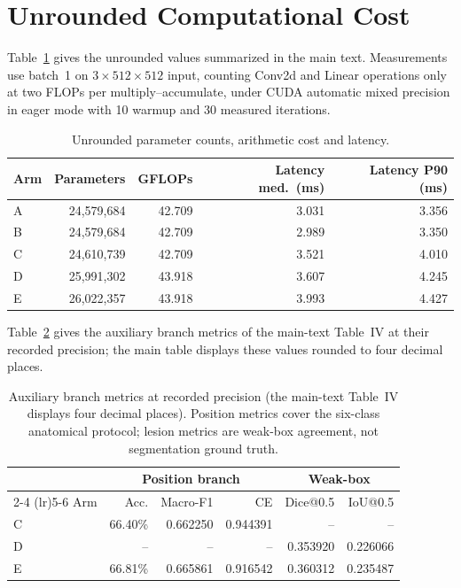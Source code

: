 \documentclass[journal]{IEEEtran}
\begin{document}
\section{Unrounded Computational Cost}

Table~\ref{tab:cost} gives the unrounded values summarized in the main text.
Measurements use batch~1 on $3\times512\times512$ input, counting Conv2d and
Linear operations only at two FLOPs per multiply--accumulate, under CUDA
automatic mixed precision in eager mode with 10 warmup and 30 measured
iterations.

\begin{table}[!t]
\centering
\caption{Unrounded parameter counts, arithmetic cost and latency.}
\label{tab:cost}
\footnotesize
\setlength{\tabcolsep}{3.5pt}
\begin{tabular}{@{}l rrrr@{}}
\toprule
Arm & Parameters & GFLOPs & Latency med.~(ms) & Latency P90 (ms) \\
\midrule
A & 24,579,684 & 42.709 & 3.031 & 3.356 \\
B & 24,579,684 & 42.709 & 2.989 & 3.350 \\
C & 24,610,739 & 42.709 & 3.521 & 4.010 \\
D & 25,991,302 & 43.918 & 3.607 & 4.245 \\
E & 26,022,357 & 43.918 & 3.993 & 4.427 \\
\bottomrule
\end{tabular}
\end{table}

Table~\ref{tab:unroundaux} gives the auxiliary branch metrics of the main-text
Table~IV at their recorded precision; the main table displays these values
rounded to four decimal places.

\begin{table}[!t]
\centering
\caption{Auxiliary branch metrics at recorded precision (the main-text
Table~IV displays four decimal places). Position metrics cover the six-class
anatomical protocol; lesion metrics are weak-box agreement, not segmentation
ground truth.}
\label{tab:unroundaux}
\footnotesize
\setlength{\tabcolsep}{3pt}
\begin{tabular}{@{}l rrr rr@{}}
\toprule
 & \multicolumn{3}{c}{Position branch} & \multicolumn{2}{c}{Weak-box} \\
\cmidrule(lr){2-4} \cmidrule(lr){5-6}
Arm & Acc. & Macro-F1 & CE & Dice@0.5 & IoU@0.5 \\
\midrule
C & 66.40\% & 0.662250 & 0.944391 & -- & -- \\
D & -- & -- & -- & 0.353920 & 0.226066 \\
E & 66.81\% & 0.665861 & 0.916542 & 0.360312 & 0.235487 \\
\bottomrule
\end{tabular}
\end{table}
\end{document}
